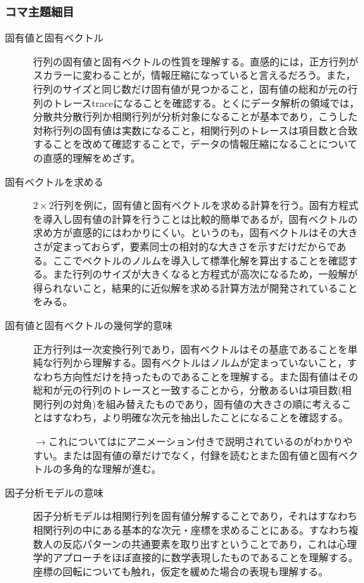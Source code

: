 \subsubsection{コマ主題細目}
\begin{description}
	\item[固有値と固有ベクトル]
	      行列の固有値と固有ベクトルの性質を理解する。直感的には，正方行列がスカラーに変わることが，情報圧縮になっていると言えるだろう。また，行列のサイズと同じ数だけ固有値が見つかること，固有値の総和が元の行列のトレースtraceになることを確認する。とくにデータ解析の領域では，分散共分散行列か相関行列が分析対象になることが基本であり，こうした対称行列の固有値は実数になること，相関行列のトレースは項目数と合致することを改めて確認することで，データの情報圧縮になることについての直感的理解をめざす。
	\item[固有ベクトルを求める]
	      $2\times2$行列を例に，固有値と固有ベクトルを求める計算を行う。固有方程式を導入し固有値の計算を行うことは比較的簡単であるが，固有ベクトルの求め方が直感的にはわかりにくい。というのも，固有ベクトルはその大きさが定まっておらず，要素同士の相対的な大きさを示すだけだからである。ここでベクトルのノルムを導入して標準化解を算出することを確認する。また行列のサイズが大きくなると方程式が高次になるため，一般解が得られないこと，結果的に近似解を求める計算方法が開発されていることをみる。
	\item[固有値と固有ベクトルの幾何学的意味]
	      正方行列は一次変換行列であり，固有ベクトルはその基底であることを単純な行列から理解する。固有ベクトルはノルムが定まっていないこと，すなわち方向性だけを持ったものであることを理解する。また固有値はその総和が元の行列のトレースと一致することから，分散あるいは項目数(相関行列の対角)を組み替えたものであり，固有値の大きさの順に考えることはすなわち，より明確な次元を抽出したことになることを確認する。

	      \begin{flushright}
		      $\to$これについては\citet{Hiraoka20041001}にアニメーション付きで説明されているのがわかりやすい。また\citet{Naganuma20110920}は固有値の章だけでなく，付録を読むとまた固有値と固有ベクトルの多角的な理解が進む。
	      \end{flushright}

	\item[因子分析モデルの意味]
	      因子分析モデルは相関行列を固有値分解することであり，それはすなわち相関行列の中にある基本的な次元・座標を求めることにある。すなわち複数人の反応パターンの共通要素を取り出すということであり，これは心理学的アプローチをほぼ直接的に数学表現したものであることを理解する。座標の回転についても触れ，仮定を緩めた場合の表現も理解する。
\end{description}
